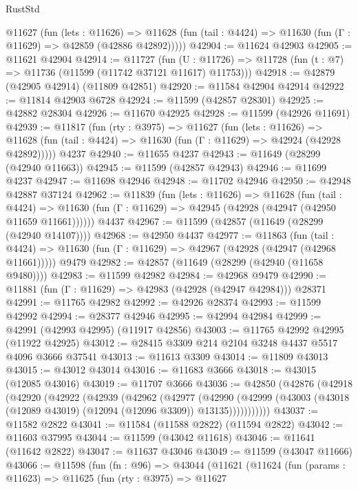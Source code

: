 \begin{lexlean}{RustStd}
\begin{coremodule}
    @11627
      (fun (lets : @11626) =>
      @11628 (fun (tail : @4424) => @11630 (fun (Γ : @11629) => @42859 (@42886 @42892)))))
@42904 := @11624 @42903
@42905 := @11621 @42904
@42914 := @11727
    (fun (U : @11726) => @11728 (fun (t : @7) => @11736 (@11599 (@11742 @37121 @11617) @11753)))
@42918 := @42879 (@42905 @42914) (@11809 @42851)
@42920 := @11584 @42904 @42914
@42922 := @11814 @42903 @6728
@42924 := @11599 (@42857 @28301)
@42925 := @42882 @28304
@42926 := @11670 @42925
@42928 := @11599 (@42926 @11691)
@42939 := @11817
    (fun (rty : @3975) =>
    @11627
      (fun (lets : @11626) =>
      @11628 (fun (tail : @4424) => @11630 (fun (Γ : @11629) => @42924 (@42928 @42892)))))
    @4237
@42940 := @11655 @4237
@42943 := @11649 (@28299 (@42940 @11663))
@42945 := @11599 (@42857 @42943)
@42946 := @11699 @4237
@42947 := @11698 @42946
@42948 := @11702 @42946
@42950 := @42948 @42887 @37124
@42962 := @11839
    (fun (lets : @11626) =>
    @11628
      (fun (tail : @4424) =>
      @11630 (fun (Γ : @11629) => @42945 (@42928 (@42947 (@42950 @11659 @11661))))))
    @4437
@42967 := @11599 (@42857 (@11649 (@28299 (@42940 @14107))))
@42968 := @42950 @4437
@42977 := @11863
    (fun (tail : @4424) => @11630 (fun (Γ : @11629) => @42967 (@42928 (@42947 (@42968 @11661)))))
    @9479
@42982 := @42857 (@11649 (@28299 (@42940 (@11658 @9480))))
@42983 := @11599 @42982
@42984 := @42968 @9479
@42990 := @11881 (fun (Γ : @11629) => @42983 (@42928 (@42947 @42984))) @28371
@42991 := @11765 @42982
@42992 := @42926 @28374
@42993 := @11599 @42992
@42994 := @28377 @42946
@42995 := @42994 @42984
@42999 := @42991 (@42993 @42995) (@11917 @42856)
@43003 := @11765 @42992 @42995 (@11922 @42925)
@43012 := @28415 @3309 @214 @2104 @3248 @4437 @5517 @4096 @3666 @37541
@43013 := @11613 @3309
@43014 := @11809 @43013
@43015 := @43012 @43014
@43016 := @11683 @3666
@43018 := @43015 (@12085 @43016)
@43019 := @11707 @3666
@43036 := @42850
    (@42876
      (@42918
        (@42920
          (@42922
            (@42939
              (@42962
                (@42977
                  (@42990
                    (@42999
                      (@43003 (@43018 (@12089 @43019) (@12094 (@12096 @3309)) @13135)))))))))))
@43037 := @11582 @2822
@43041 := @11584 (@11588 @2822) (@11594 @2822)
@43042 := @11603 @37995
@43044 := @11599 (@43042 @11618)
@43046 := @11641 (@11642 @2822)
@43047 := @11637 @43046
@43049 := @11599 (@43047 @11666)
@43066 := @11598
    (fun (fn : @96) =>
    @43044
      (@11621
        (@11624
          (fun (params : @11623) =>
          @11625
            (fun (rty : @3975) =>
            @11627

\end{coremodule}
\end{lexlean}
